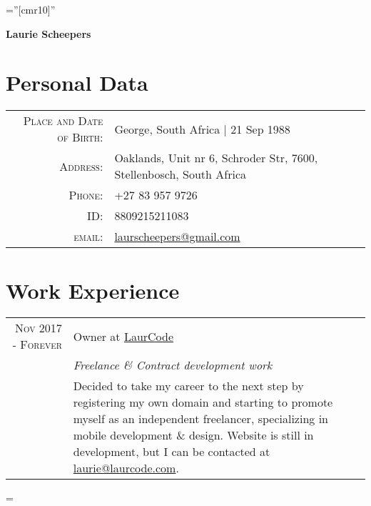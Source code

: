 \documentclass[a4paper,10pt,notitlepage]{article}
\newenvironment{absolutelynopagebreak}
  {\par\nobreak\vfil\penalty0\vfilneg
   \vtop\bgroup}
  {\par\xdef\tpd{\the\prevdepth}\egroup
   \prevdepth=\tpd}
\begin{document}
\pagestyle{empty} %

\font\fb=''[cmr10]'' %


\addtolength{\voffset}{-0.8cm} %

\begin{absolutelynopagebreak}
	
	\begin{center}
		\begin{center}
			\Huge\textbf{Laurie Scheepers}
		\end{center}
	\end{center}
		
	\section{Personal Data}
	
	\begin{tabular}{rl}
		\textsc{Place and Date of Birth:} & George, South Africa  | 21 Sep 1988                                 \\
		\textsc{Address:}                 & Oaklands, Unit nr 6, Schroder Str, 7600, Stellenbosch, South Africa \\
		\textsc{Phone:}                   & +27 83 957 9726                                                     \\
		\textsc{ID:}                      & 8809215211083                                                       \\
		\textsc{email:}                   & \href{mailto:laurscheepers@gmail.com}{laurscheepers@gmail.com}      
	\end{tabular}
	
	
	\section{Work Experience}
	\begin{tabular}{r|p{11cm}}
		
		\textsc{Nov 2017 - Forever}  & Owner at \href{www.laurcode.com}{LaurCode}
		\\&\emph{Freelance \& Contract development work}\\&\footnotesize{Decided to take my career to the next step by registering my own domain and starting to promote myself as an independent freelancer, specializing in mobile development \& design. Website is still in development, but I can be contacted at \href{mailto:laurie@laurcode.com}{laurie@laurcode.com}.} \\
		

\end{tabular}
\end{absolutelynopagebreak}
\end{document}
